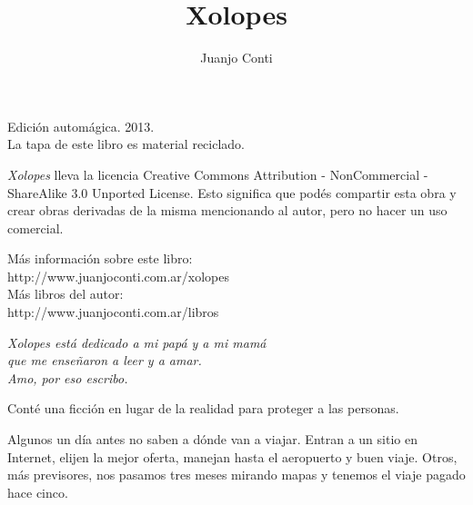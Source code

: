 \documentclass[11pt,twoside,openright,a6paper]{book}
\title{Xolopes}
\author{Juanjo Conti}
\date{}
\begin{document}
\pagestyle{plain}

\maketitle

\cleardoublepage

\thispagestyle{empty}
\noindent
Edición automágica. 2013.\\
La tapa de este libro es material reciclado.

\vspace{0.5cm}

\noindent
\emph{Xolopes} lleva la licencia 
Creative Commons Attribution - NonCommercial - ShareAlike 3.0 Unported License.
Esto significa que podés compartir esta obra y crear obras derivadas de la misma
mencionando al autor, pero no ha\-cer un uso comercial.

\vfill

\noindent
Más información sobre este libro:\\
http://www.juanjoconti.com.ar/xolopes\\

\noindent
Más libros del autor:\\
http://www.juanjoconti.com.ar/libros

\cleardoublepage

\noindent
\begin{flushright}
\emph{
\emph{Xolopes} está dedicado a mi papá y a mi mamá\\
que me enseñaron a leer y a amar.\\
Amo, por eso escribo.
}
\end{flushright}

\cleardoublepage


\vspace{0.5cm}
\hrulefill\hspace{0.2cm} \decofourleft\decofourright \hspace{0.2cm} \hrulefill
\vspace{0.5cm}

Conté una ficción en lugar de la realidad para proteger a las personas.


\vspace{0.5cm}
\hrulefill\hspace{0.2cm} \decofourleft\decofourright \hspace{0.2cm} \hrulefill
\vspace{0.5cm}

Algunos un día antes no saben a dónde van a viajar. Entran a un sitio
en Internet, elijen la mejor oferta, manejan hasta el aeropuerto y buen
viaje. Otros, más previsores, nos pasamos tres meses mirando mapas y
tenemos el viaje pagado hace cinco.
\end{document}
